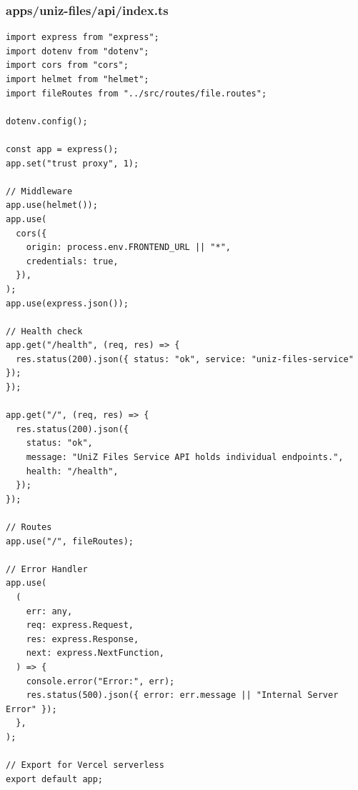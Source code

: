 \documentclass[11pt,a4paper,oneside]{article}
\begin{document}
\subsubsection*{apps/uniz-files/api/index.ts}
\begin{lstlisting}
import express from "express";
import dotenv from "dotenv";
import cors from "cors";
import helmet from "helmet";
import fileRoutes from "../src/routes/file.routes";

dotenv.config();

const app = express();
app.set("trust proxy", 1);

// Middleware
app.use(helmet());
app.use(
  cors({
    origin: process.env.FRONTEND_URL || "*",
    credentials: true,
  }),
);
app.use(express.json());

// Health check
app.get("/health", (req, res) => {
  res.status(200).json({ status: "ok", service: "uniz-files-service" });
});

app.get("/", (req, res) => {
  res.status(200).json({
    status: "ok",
    message: "UniZ Files Service API holds individual endpoints.",
    health: "/health",
  });
});

// Routes
app.use("/", fileRoutes);

// Error Handler
app.use(
  (
    err: any,
    req: express.Request,
    res: express.Response,
    next: express.NextFunction,
  ) => {
    console.error("Error:", err);
    res.status(500).json({ error: err.message || "Internal Server Error" });
  },
);

// Export for Vercel serverless
export default app;

\end{lstlisting}
\end{document}
